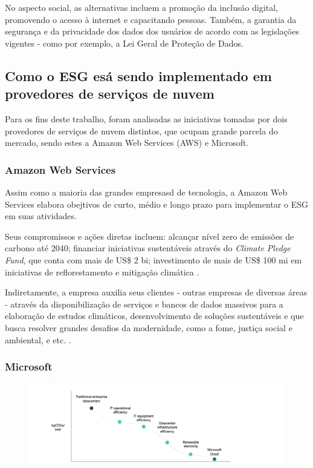 \documentclass[12pt]{article}
\begin{document}
	No aspecto social, as alternativas incluem a promoção da inclusão digital, promovendo o acesso à internet e capacitando pessoas. Também, a garantia da segurança e da privacidade dos dados dos usuários de acordo com as legislações vigentes - como  por exemplo, a Lei Geral de Proteção de Dados.
	
	\subsection*{Como o ESG esá sendo implementado em provedores de serviços de nuvem}
	
	Para os fins deste trabalho, foram analisadas as iniciativas tomadas por dois provedores de serviços de nuvem distintos, que ocupam grande parcela do mercado, sendo estes a Amazon Web Services (AWS) e Microsoft.
	
	\subsubsection*{Amazon Web Services}
	
	Assim como a maioria das grandes empresasd de tecnologia, a Amazon Web Services elabora obejtivos de curto, médio e longo prazo para implementar o ESG em suas atividades.
	
	Seus compromissos e ações diretas incluem: alcançar nível zero de emissões de carbono até 2040; financiar iniciativas sustentáveis através do \emph{Climate Pledge Fund}, que conta com mais de US\$ 2 bi; investimento de mais de US\$ 100 mi em iniciativas de reflorestamento e mitigação climática \cite{amazonwebservicesClimateConnections2022}.
	
	Indiretamente, a empresa auxilia seus clientes - outras empresas de diversas áreas - através da disponibilização de serviços e bancos de dados massivos para a elaboração de estudos climáticos, desenvolvimento de soluções sustentáveis e que busca resolver grandes desafios da modernidade, como a fome, justiça social e ambiental, e etc. \cite{amazonwebservicesClimateConnections2022}.
	
	\subsubsection*{Microsoft}
	
	
	
	\begin{figure}
		\centering
		\includegraphics[width=0.7\linewidth]{pictures/microsoft-intiatives}
		\caption[Iniciativas da Microsoft que reduzem seu impacto ambiental]{}
		\label{fig:microsoft-intiatives}
	\end{figure}
	
	
	
	
	
\end{document}
